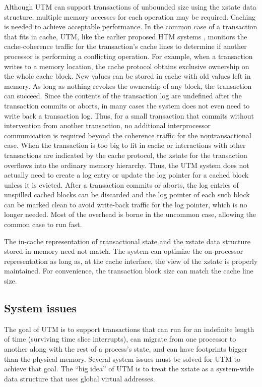 Although UTM can support transactions of unbounded size using the
xstate data structure, multiple memory accesses for each operation may
be required.  Caching is needed to achieve acceptable performance.  In
the common case of a transaction that fits in cache, UTM, like the
earlier proposed HTM systems \cite{Knight86,HerlihyMo93}, monitors the
cache-coherence traffic for the transaction's cache lines to determine
if another processor is performing a conflicting operation.  For
example, when a transaction writes to a memory location, the cache
protocol obtains exclusive ownership on the whole cache block.  New
values can be stored in cache with old values left in memory.  As long
as nothing revokes the ownership of any block, the transaction can
succeed.  Since the contents of the transaction log are undefined
after the transaction commits or aborts, in many cases the system does
not even need to write back a transaction log.  Thus, for a small
transaction that commits without intervention from another
transaction, no additional interprocessor communication is required
beyond the coherence traffic for the nontransactional case.  When the
transaction is too big to fit in cache or interactions with other
transactions are indicated by the cache protocol, the xstate for the
transaction overflows into the ordinary memory hierarchy.  Thus, the
UTM system does not actually need to create a log entry or update
the log pointer for a cached block unless it is evicted.  After a
transaction commits or aborts, the log entries of unspilled cached
blocks can be discarded and the log pointer of each such block can be
marked clean to avoid write-back traffic for the log pointer, which is
no longer needed.  Most of the overhead is borne in the uncommon case,
allowing the common case to run fast.

The in-cache representation of transactional state and the xstate data
structure stored in memory need not match.  The system can optimize
the on-processor representation as long as, at the cache interface, the
view of the xstate is properly maintained.  For convenience, the
transaction block size can match the cache line size.

\subsection{System issues}

The goal of UTM is to support transactions that can run for an
indefinite length of time (surviving time slice interrupts), can
migrate from one processor to another along with the rest of a
process's state, and can have footprints bigger than the physical
memory.  Several system issues must be solved for UTM to achieve that
goal.  The ``big idea'' of UTM is to treat the xstate as
a system-wide data structure that uses global virtual addresses.

